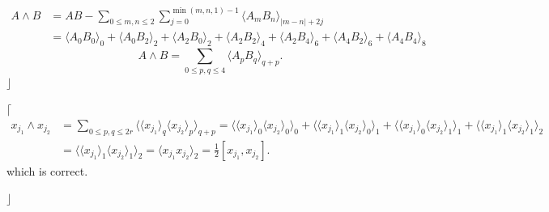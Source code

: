 \documentclass[aps, preprint]{revtex4}
\begin{document}
\begin{align}A \wedge B &  =A B -\sum _{0 \leq m ,n \leq 2}\sum _{j =0}^{\min \left (m ,n ,1\right ) -1} \langle A_{m} B_{n} \rangle _{\left \vert m -n\right \vert  +2 j} \\
 &  = \langle A_{0} B_{0} \rangle _{0} + \langle A_{0} B_{2} \rangle _{2} + \langle A_{2} B_{0} \rangle _{2} + \langle A_{2} B_{2} \rangle _{4} + \langle A_{2} B_{4} \rangle _{6} + \langle A_{4} B_{2} \rangle _{6} + \langle A_{4} B_{4} \rangle _{8}\end{align}
\begin{equation}A \wedge B =\sum _{0 \leq p ,q \leq 4} \langle A_{p} B_{q} \rangle _{q +p}\text{.}
\end{equation}$\rfloor $ 

$\lceil $
\begin{align}x_{j_{1}} \wedge x_{j_{2}} &  =\sum _{0 \leq p ,q \leq 2 r} \langle  \langle x_{j_{1}} \rangle _{q}  \langle x_{j_{2}} \rangle _{p} \rangle _{q +p} = \langle  \langle x_{j_{1}} \rangle _{0}  \langle x_{j_{2}} \rangle _{0} \rangle _{0} + \langle  \langle x_{j_{1}} \rangle _{1}  \langle x_{j_{2}} \rangle _{0} \rangle _{1} + \langle  \langle x_{j_{1}} \rangle _{0}  \langle x_{j_{2}} \rangle _{1} \rangle _{1} + \langle  \langle x_{j_{1}} \rangle _{1}  \langle x_{j_{2}} \rangle _{1} \rangle _{2} \\
 &  = \langle  \langle x_{j_{1}} \rangle _{1}  \langle x_{j_{2}} \rangle _{1} \rangle _{2} = \langle x_{j_{1}} x_{j_{2}} \rangle _{2} =\frac{1}{2} \left [x_{j_{1}} ,x_{j_{2}}\right ]\text{.}\end{align}which is correct. 

$\rfloor $ 
\end{document}
